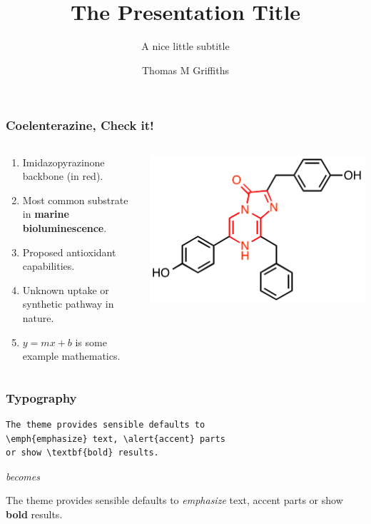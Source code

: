 \documentclass[aspectratio=169]{beamer}
\title{The Presentation Title}
\subtitle{A nice little subtitle}
\author[Thomas]{Thomas M Griffiths}
\institute{School of Chemistry}
\date{}
\begin{document}
\maketitle

\begin{frame}
   \frametitle{Coelenterazine, Check it!}
   \begin{columns}[T]
      \begin{column}{0.5\textwidth}
         \begin{enumerate}
            \item Imidazopyrazinone backbone (in red).
            \item Most common substrate in \textbf{marine bioluminescence}.
            \item Proposed antioxidant capabilities.
            \item Unknown uptake or synthetic pathway in nature.
            \item $y=mx+b$ is some example mathematics.
         \end{enumerate}
      \end{column}
      \begin{column}{0.5\textwidth}
         \centering
         \includegraphics[width=\textwidth]{coelenterazine.png}
      \end{column}
   \end{columns}
\end{frame}

\begin{frame}[fragile]
\frametitle{Typography}
\begin{verbatim}
The theme provides sensible defaults to 
\emph{emphasize} text, \alert{accent} parts 
or show \textbf{bold} results.
\end{verbatim}
\begin{center} \textit{becomes} \end{center}
The theme provides sensible defaults to \emph{emphasize} text, \alert{accent} parts or show \textbf{bold} results.
\end{frame}
\end{document}
